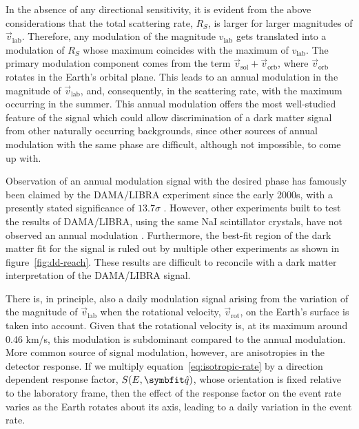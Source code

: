 In the absence of any directional sensitivity, it is evident from the above considerations that the total scattering rate, $R_S$, is larger for larger magnitudes of $\vec{v}_\text{lab}$. Therefore, any modulation of the magnitude $v_\text{lab}$ gets translated into a modulation of $R_S$ whose maximum coincides with the maximum of $v_\text{lab}$. The primary modulation component comes from the term $\vec{v}_\text{sol}+\vec{v}_\text{orb}$, where $\vec{v}_\text{orb}$ rotates in the Earth's orbital plane. This leads to an annual modulation in the magnitude of $\vec{v}_\text{lab}$, and, consequently, in the scattering rate, with the maximum occurring in the summer. This annual modulation offers the most well-studied feature of the signal which could allow discrimination of a dark matter signal from other naturally occurring backgrounds, since other sources of annual modulation with the same phase are difficult, although not impossible, to come up with.

Observation of an annual modulation signal with the desired phase has famously been claimed by the DAMA/LIBRA experiment since the early 2000s, with a presently stated significance of $13.7\sigma$ \parencite{BernabeiEtAl2023}. However, other experiments built to test the results of DAMA/LIBRA, using the same NaI scintillator crystals, have not observed an annual modulation \parencites{DMIce2017, COSINE1002019, COSINE1002024, KIMS2019, ANAIS2024}. Furthermore, the best-fit region of the dark matter fit for the signal is ruled out by multiple other experiments as shown in figure~\ref{fig:dd-reach}.  These results are difficult to reconcile with a dark matter interpretation of the DAMA/LIBRA signal.

There is, in principle, also a daily modulation signal arising from the variation of the magnitude of $\vec{v}_\text{lab}$ when the rotational velocity, $\vec{v}_\text{rot}$, on the Earth's surface is taken into account. Given that the rotational velocity is, at its maximum around 0.46 km/s, this modulation is subdominant compared to the annual modulation. More common source of signal modulation, however, are anisotropies in the detector response. If we multiply equation~\eqref{eq:isotropic-rate} by a direction dependent response factor, $S(E,\unitv{q})$, whose orientation is fixed relative to the laboratory frame, then the effect of the response factor on the event rate varies as the Earth rotates about its axis, leading to a daily variation in the event rate.

